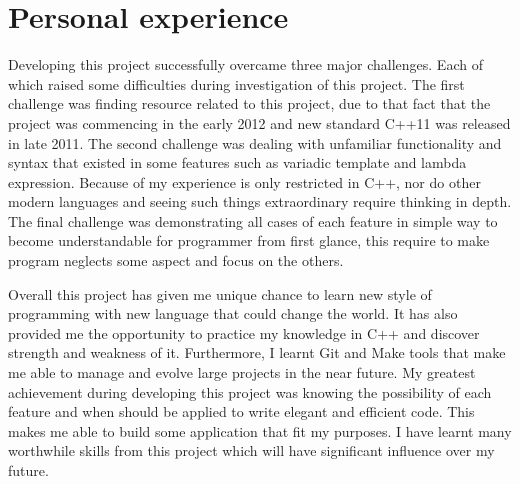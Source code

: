 \documentclass[11pt]{report}
\begin{document}
\section{Personal experience}
\label{sec: personal experience}
Developing this project successfully overcame three major challenges. Each of which raised some difficulties during investigation of this project. The first challenge was finding resource related to this project, due to that fact that the project was commencing in the early 2012 and new standard C++11 was released in late 2011. The second challenge was dealing with unfamiliar functionality and syntax that existed in some features such as variadic template and lambda expression. Because of my experience is only restricted in C++, nor do other modern languages and seeing such things extraordinary require thinking in depth. The final challenge was demonstrating all cases of each feature in simple way to become understandable for programmer from first glance, this require to make program neglects some aspect and focus on the others.

Overall this project has given me unique chance to learn new style of programming with new language that could change the world. It has also provided me the opportunity to practice my knowledge in C++ and discover strength and weakness of it. Furthermore, I learnt Git and Make tools that make me able to manage and evolve large projects in the near future. My greatest achievement during developing this project was knowing the possibility of each feature and when should be applied to write elegant and efficient code. This makes me able to build some application that fit my purposes. I have learnt many worthwhile skills from this project which will have significant influence over my future.


	
\end{document}
